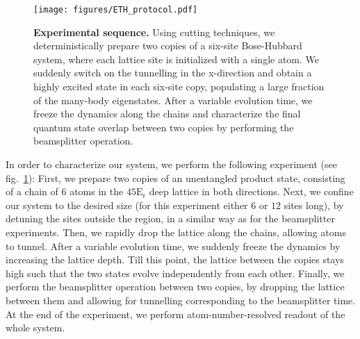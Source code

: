 
\begin{figure}[t]
	\centering
	\texttt{[image: figures/ETH\_protocol.pdf]}
	\caption{{\bf Experimental sequence.} Using cutting techniques, we deterministically prepare two copies of a six-site Bose-Hubbard system, where each lattice site is initialized with a single atom. We suddenly switch on the tunnelling in the x-direction and obtain a highly excited state in each six-site copy, populating a large fraction of the many-body eigenstates. After a variable evolution time, we freeze the dynamics along the chains and characterize the final quantum state overlap between two copies by performing the beamsplitter operation.}
	
	\label{fig:CBH_purity_protocol}
\end{figure} 

In order to characterize our system, we perform the following experiment (see fig.~\ref{fig:CBH_purity_protocol}): First, we prepare two copies of an unentangled product state, consisting of a chain of $6$ atoms in the $45 \mathrm{E_r}$ deep lattice in both directions. Next, we confine our system to the desired size (for this experiment either $6$ or $12$ sites long), by detuning the sites outside the region, in a similar way as for the beamsplitter experiments. Then, we rapidly drop the lattice along the chains, allowing atoms to tunnel. After a variable evolution time, we suddenly freeze the dynamics by increasing the lattice depth. Till this point, the lattice between the copies stays high such that the two states evolve independently from each other. Finally, we perform the beamsplitter operation between two copies, by dropping the lattice between them and allowing for tunnelling corresponding to the beamsplitter time. At the end of the experiment, we perform atom-number-resolved readout of the whole system.

